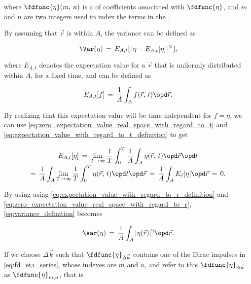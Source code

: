 {where $\fdfunc{\eta}(m,\,n)$ is a \twodimensional \sequence of coefficients associated with $\fdfunc{\eta}$, and $m$ and $n$ are two integers used to index the terms in the \series.

By  assuming that $\vec{r}$ is  within $A$, the variance can be defined as

\begin{equation} \label{eq:variance_definition}
\Var(\eta) \,=\, E_{A,t}[\,|\eta - E_{A,t}[\eta]\,|^2\,],
\end{equation}

where $E_{A,t}$ denotes the expectation value for a $\vec{r}$ that is uniformly distributed within $A$, for a fixed time, and can be defined as

\begin{equation} \label{eq:expectation_value_with_regard_to_r_definition}
E_{A,t}[f] \,=\, \frac{1}{A}\int_A f(\vec{r},\,t)\opd\vec{r}.
\end{equation}

By realizing that this expectation value will be time independent for $f = \eta$, we can use \eqref{eq:zero_expectation_value_real_space_with_regard_to_t} and \eqref{eq:expectation_value_with_regard_to_t_definition} to get

\begin{equation} \label{eq:zero_expectation_value_real_space_with_regard_to_r}
\renewcommand*{\arraystretch}{2}
\begin{array}{c}
\displaystyle E_{A,t}[\eta] \,=\, \lim_{T\to\infty}\frac{1}{T}\int_0^T\frac{1}{A}\int_A \eta(\vec{r},\,t)\opd\vec{r}\opd t \\
\displaystyle =\, \frac{1}{A}\int_A\lim_{T\to\infty}\frac{1}{T}\int_0^T \eta(\vec{r},\,t)\opd t\opd\vec{r} \,=\, \frac{1}{A}\int_A E_{\vec{r}}[\eta]\opd\vec{r} \,=\, 0.
\end{array}
\end{equation}


By using using \eqref{eq:expectation_value_with_regard_to_r_definition} and \eqref{eq:zero_expectation_value_real_space_with_regard_to_r}, \eqref{eq:variance_definition} becomes

\begin{equation}
\Var(\eta) \,=\, \frac{1}{A}\int_A|\eta(\vec{r})|^2\opd\vec{r}.
\end{equation}

If we choose $\Delta\vec{k}$ such that $\fdfunc{\eta}_{\Delta\vec{k}}$ contains one of the Dirac impulses in \eqref{eq:fd_eta_series}, whose indexes are $m$ and $n$, and refer to this $\fdfunc{\eta}_{\Delta\vec{k}}$  as $\fdfunc{\eta}_{m,n}$, that is

}
